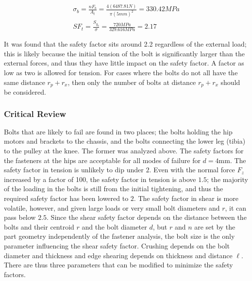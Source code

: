 \begin{gather}
    \sigma_b = \frac{n F_b}{A_t} = \frac{4(6487.81N)}{\pi(5mm)^2} = 330.42MPa
    \\
    {SF}_t = \frac{S_{y_b}}{\sigma} = \frac{720MPa}{329.616MPa} = 2.17
\end{gather}{}

It was found that the safety factor sits around 2.2 regardless of the external load; this is likely because the initial tension of the bolt is significantly larger than the external forces, and thus they have little impact on the safety factor.
A factor as low as two is allowed for tension.
For cases where the bolts do not all have the same distance $r_p+r_x$, then only the number of bolts at distance $r_p+r_x$ should be considered.


\subsubsection{Critical Review}

Bolts that are likely to fail are found in two places; the bolts holding the hip motors and brackets to the chassis, and the bolts connecting the lower leg (tibia) to the pulley at the knee.
The former was analyzed above.
The safety factors for the fasteners at the hips are acceptable for all modes of failure for $d=4\text{mm}$.
The safety factor in tension is unlikely to dip under $2$.
Even with the normal force $F_z$ increased by a factor of 100, the safety factor in tension is above $1.5$; the majority of the loading in the bolts is still from the initial tightening, and thus the required safety factor has been lowered to $2$.
The safety factor in shear is more volatile, however, and given large loads or very small bolt diameters and $r$, it can pass below $2.5$.
Since the shear safety factor depends on the distance between the bolts and their centroid $r$ and the bolt diameter $d$, but $r$ and $n$ are set by the part geometry independently of the fastener analysis, the bolt size is the only parameter influencing the shear safety factor.
Crushing depends on the bolt diameter and thickness and edge shearing depends on thickness and distance $\ell$.
There are thus three parameters that can be modified to minimize the safety factors.

